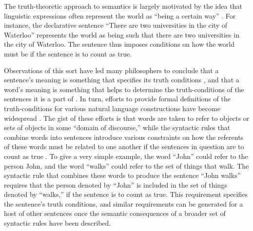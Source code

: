 The truth-theoretic approach to semantics is largely motivated by the idea that linguistic expressions often represent the world as ``being a certain way'' \citep[][p. 1] {Soames:2010}. For instance, the declarative sentence ``There are two universities in the city of Waterloo'' represents the world as being such that there are two universities in the city of Waterloo. The sentence thus imposes conditions on how the world must be if the sentence is to count as true.

Observations of this sort have led many philosophers to conclude that a sentence's meaning is something that specifies its truth conditions \citep{Soames:2010,Stanley:2008,Lewis:1970,Lewis:1975,Davidson:1967}, and that a word's meaning is something that helps to determine the truth-conditions of the sentences it is a part of \citep{Davidson:1967}. In turn, efforts to provide formal definitions of the truth-conditions for various natural language constructions have become widespread \citep[see][for examples]{Lewis:1970,Carpenter:1997}. The gist of these efforts is that words are taken to refer to objects or sets of objects in some ``domain of discourse,'' while the syntactic rules that combine words into sentences introduce various constraints on how the referents of these words must be related to one another if the sentences in question are to count as true \citep{Stanley:2008}. To give a very simple example, the word ``John'' could refer to the person John, and the word ``walks'' could refer to the set of things that walk. The syntactic rule that combines these words to produce the sentence ``John walks'' requires that the person denoted by ``John'' is included in the set of things denoted by ``walks,'' if the sentence is to count as true. This requirement specifies the sentence's truth conditions, and similar requirements can be generated for a host of other sentences once the semantic consequences of a broader set of syntactic rules have been described.

